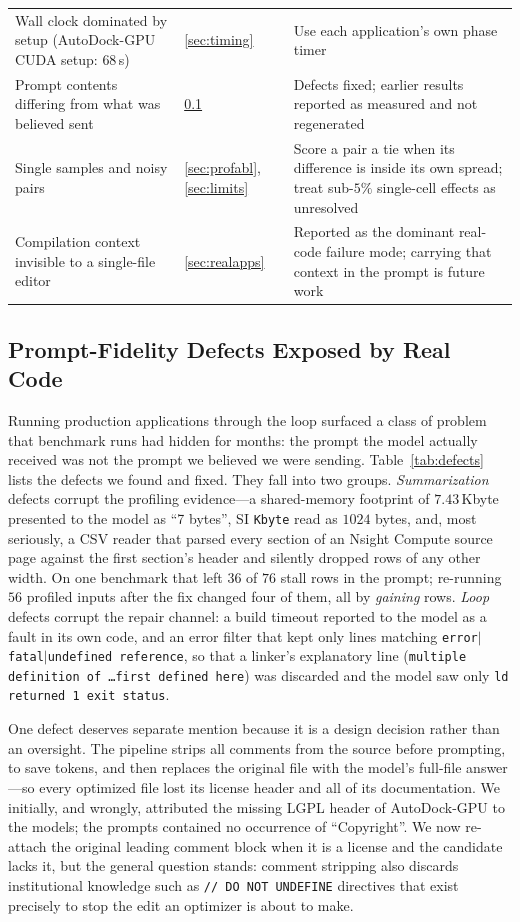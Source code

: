 \begin{table}[t]
\begin{tabular}{@{}p{}p{}p{}@{}}
Wall clock dominated by setup (AutoDock-GPU CUDA setup: $68$\,s)
  & \ref{sec:timing} & Use each application's own phase timer \\
Prompt contents differing from what was believed sent
  & \ref{sec:defects} & Defects fixed; earlier results reported as measured and not regenerated \\
Single samples and noisy pairs
  & \ref{sec:profabl}, \ref{sec:limits} & Score a pair a tie when its difference is inside its own spread; treat sub-$5\%$ single-cell effects as unresolved \\
Compilation context invisible to a single-file editor
  & \ref{sec:realapps} & Reported as the dominant real-code failure mode; carrying that context in the prompt is future work \\
\bottomrule
\end{tabular}
\end{table}

\subsection{Prompt-Fidelity Defects Exposed by Real Code}
\label{sec:defects}
Running production applications through the loop surfaced a class of problem that benchmark runs had
hidden for months: the prompt the model actually received was not the prompt we believed we were
sending. Table~\ref{tab:defects} lists the defects we found and fixed. They fall into two groups.
\emph{Summarization} defects corrupt the profiling evidence---a shared-memory footprint of
$7.43$\,Kbyte presented to the model as ``7 bytes'', SI \texttt{Kbyte} read as $1024$ bytes, and, most
seriously, a CSV reader that parsed every section of an Nsight Compute source page against the first
section's header and silently dropped rows of any other width. On one benchmark that left $36$ of $76$
stall rows in the prompt; re-running $56$ profiled inputs after the fix changed four of them, all by
\emph{gaining} rows. \emph{Loop} defects corrupt the repair channel: a build timeout reported to the
model as a fault in its own code, and an error filter that kept only lines matching
\texttt{error}$|$\texttt{fatal}$|$\texttt{undefined reference}, so that a linker's explanatory line
(\texttt{multiple definition of \ldots first defined here}) was discarded and the model saw only
\texttt{ld returned 1 exit status}.

One defect deserves separate mention because it is a design decision rather than an oversight. The
pipeline strips all comments from the source before prompting, to save tokens, and then replaces the
original file with the model's full-file answer---so every optimized file lost its license header and
all of its documentation. We initially, and wrongly, attributed the missing LGPL header of AutoDock-GPU to the
models; the prompts contained no occurrence of ``Copyright''. We now re-attach the original leading
comment block when it is a license and the candidate lacks it, but the general question stands: comment
stripping also discards institutional knowledge such as \texttt{// DO NOT UNDEFINE} directives that
exist precisely to stop the edit an optimizer is about to make.

